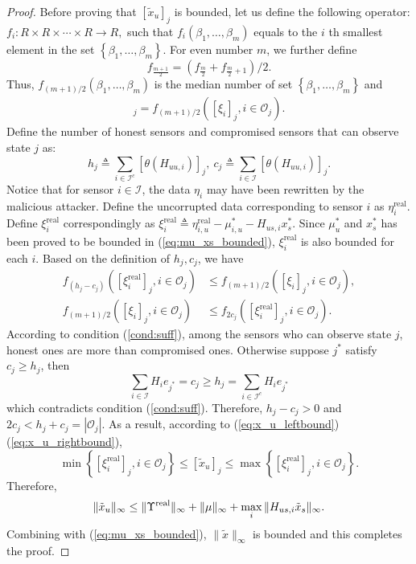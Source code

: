 \documentclass[12pt]{article}
\newcommand{\I}{{\mathcal{I}}}
\newcommand{\Oc}{{\mathcal{O}}}
\newcommand{\re}{\text{real}}
\newtheorem*{proof}{\textbf{Proof}}
\begin{document}
\begin{proof}
Before proving that $[\tilde{x}_u]_j$ is bounded, let us define the following operator: $f_{i}: R \times R \times \cdots \times R \rightarrow R,$ such that $f_{i}\left(\beta_{1}, \ldots, \beta_{m}\right)$ equals to the $i$ th smallest element in the set $\left\{\beta_{1}, \ldots, \beta_{m}\right\} .$ For even number $m$, we further define 
$$f_{\frac{m+1}{2}} = \left(f_{\frac{m}{2}} + f_{\frac{m}{2}+1}\right)/2.$$ 
Thus, $f_{(m+1)/2}\left(\beta_{1}, \ldots, \beta_{m}\right)$ is the median number of set $\left\{\beta_{1}, \ldots, \beta_{m}\right\}$ and 
\begin{align*}
	[\tilde{x}_u]_j = f_{(m+1)/2}\left([\xi_i]_j, i\in\Oc_j\right).
\end{align*}
Define the number of honest sensors and compromised sensors that can observe state $j$ as:
\begin{equation*}
	h_j\triangleq	\sum_{i\in\I^c} [\theta(H_{uu,i})]_j , \
	c_j\triangleq \sum_{i\in\I} [\theta(H_{uu,i})]_j.
\end{equation*}
Notice that for sensor $i\in\I$, the data $\eta_{i}$ may have been rewritten by the malicious attacker. Define the uncorrupted data corresponding to sensor $i$ as $\eta^{\re}_{i}$. Define $\xi^{\re}_{i}$ correspondingly as $\xi^\re_i\triangleq \eta^\re_{i,u}-\mu^*_{i,u}- H_{us,i} x^*_s $.
Since $\mu^*_u$ and $x^*_s$ has been proved to be bounded in (\ref{eq:mu_xs_bounded}), $\xi^\re_i$ is also bounded for each $i$.
Based on the definition of $h_j,c_j$, we have
\begin{align}	
f_{(h_j-c_j)}\left([\xi^\re_i]_j, i\in\Oc_j\right) &\leq
f_{(m+1)/2}\left([\xi_i]_j, i\in\Oc_j\right), \label{eq:x_u_leftbound}\\
f_{(m+1)/2}\left([\xi_i]_j, i\in\Oc_j\right)&\leq 
f_{2c_j}\left([\xi^\re_i]_j, i\in\Oc_j\right) .  \label{eq:x_u_rightbound}
\end{align}
According to condition (\ref{cond:suff}), among the sensors who can observe state $j$, honest ones are more than compromised ones. Otherwise suppose $j^*$ satisfy $ c_j\geq h_j$, then
$$\sum_{i\in\I} H_i e_{j^*}  =c_j \geq h_j =\sum_{i\in\I^c} H_{i} e_{j^*} $$
%
which contradicts condition (\ref{cond:suff}).
Therefore, $h_j-c_j>0$ and $2c_j<h_j+c_j=|\Oc_j|$.
As a result, according to (\ref{eq:x_u_leftbound})(\ref{eq:x_u_rightbound}),
$$\min \left\{ [\xi^\re_i]_j, i\in\Oc_j \right\}\leq [\tilde{x}_u]_j\leq \max \left\{ [\xi^\re_i]_j, i\in\Oc_j \right\}.$$
Therefore, 
$$\|\tilde{x}_u\|_\infty \leq\|\Upsilon^{\rm real} \|_\infty + \|\mu\|_\infty+ \max_i  \|H_{us,i}\tilde{x}_s\|_\infty .$$
Combining with (\ref{eq:mu_xs_bounded}), $\|\tilde{x}\|_\infty$ is bounded and this completes the proof.


\end{proof}
\end{document}
